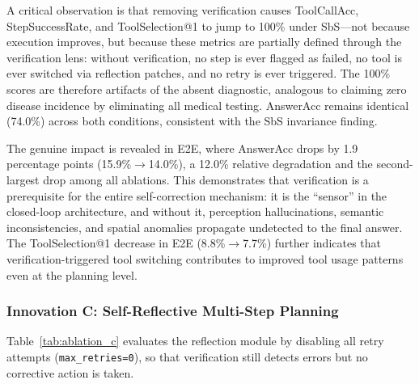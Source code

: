 \documentclass[journal]{IEEEtran}
\begin{document}
A critical observation is that removing verification causes ToolCallAcc, StepSuccessRate, and ToolSelection@1 to jump to 100\% under SbS---not because execution improves, but because these metrics are partially defined through the verification lens: without verification, no step is ever flagged as failed, no tool is ever switched via reflection patches, and no retry is ever triggered.
The 100\% scores are therefore artifacts of the absent diagnostic, analogous to claiming zero disease incidence by eliminating all medical testing.
AnswerAcc remains identical (74.0\%) across both conditions, consistent with the SbS invariance finding.

The genuine impact is revealed in E2E, where AnswerAcc drops by 1.9 percentage points (15.9\%$\rightarrow$14.0\%), a 12.0\% relative degradation and the second-largest drop among all ablations.
This demonstrates that verification is a prerequisite for the entire self-correction mechanism: it is the ``sensor'' in the closed-loop architecture, and without it, perception hallucinations, semantic inconsistencies, and spatial anomalies propagate undetected to the final answer.
The ToolSelection@1 decrease in E2E (8.8\%$\rightarrow$7.7\%) further indicates that verification-triggered tool switching contributes to improved tool usage patterns even at the planning level.

\subsubsection{Innovation C: Self-Reflective Multi-Step Planning}

Table~\ref{tab:ablation_c} evaluates the reflection module by disabling all retry attempts (\texttt{max\_retries=0}), so that verification still detects errors but no corrective action is taken.
\end{document}
